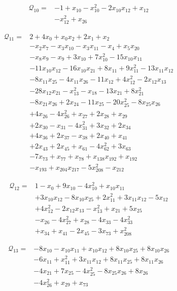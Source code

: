 \begin{align*}
\mathcal{Q}_{10}={}&-1+x_{10}-x_{10}^{2}-2x_{10}x_{12}+x_{12}\\
&-x_{12}^{2}+x_{26}
\end{align*}

\begin{align*}
\mathcal{Q}_{11}={}&2+4x_{0}+x_{0}x_{2}+2x_{1}+x_{2}\\
&-x_{2}x_{7}-x_{3}x_{10}-x_{3}x_{11}-x_{4}+x_{5}x_{20}\\
&-x_{8}x_{9}-x_{9}+3x_{10}+7x_{10}^{2}-15x_{10}x_{11}\\
&-11x_{10}x_{12}-16x_{10}x_{21}+8x_{11}+9x_{11}^{2}-13x_{11}x_{12}\\
&-8x_{11}x_{25}-4x_{11}x_{26}-11x_{12}+4x_{12}^{2}-2x_{12}x_{13}\\
&-28x_{12}x_{21}-x_{13}^{2}-x_{18}-13x_{21}+8x_{21}^{2}\\
&-8x_{21}x_{26}+2x_{24}-11x_{25}-20x_{25}^{2}-8x_{25}x_{26}\\
&+4x_{26}-4x_{26}^{2}+x_{27}+2x_{28}+x_{29}\\
&+2x_{30}-x_{31}-4x_{31}^{2}+3x_{32}+2x_{34}\\
&+4x_{36}+2x_{37}-x_{38}+2x_{40}+x_{41}\\
&+2x_{43}+2x_{45}+x_{61}-4x_{62}^{2}+3x_{63}\\
&-7x_{73}+x_{77}+x_{78}+x_{138}x_{192}+x_{192}\\
&-x_{193}+x_{204}x_{217}-5x_{208}^{2}-x_{212}
\end{align*}

\begin{align*}
\mathcal{Q}_{12}={}&1-x_{0}+9x_{10}-4x_{10}^{2}+x_{10}x_{11}\\
&+3x_{10}x_{12}-8x_{10}x_{25}+2x_{11}^{2}+3x_{11}x_{12}-5x_{12}\\
&+4x_{12}^{2}-2x_{12}x_{13}-x_{13}^{2}+x_{21}+5x_{25}\\
&-x_{26}-4x_{27}^{2}+x_{28}-4x_{33}-4x_{33}^{2}\\
&+x_{34}+x_{41}-2x_{45}-3x_{73}+x_{208}^{2}
\end{align*}

\begin{align*}
\mathcal{Q}_{13}={}&-8x_{10}-x_{10}x_{11}+x_{10}x_{12}+8x_{10}x_{25}+8x_{10}x_{26}\\
&-6x_{11}+x_{11}^{2}+3x_{11}x_{12}+8x_{11}x_{25}+8x_{11}x_{26}\\
&-4x_{21}+7x_{25}-4x_{25}^{2}-8x_{25}x_{26}+8x_{26}\\
&-4x_{26}^{2}+x_{29}+x_{73}
\end{align*}

